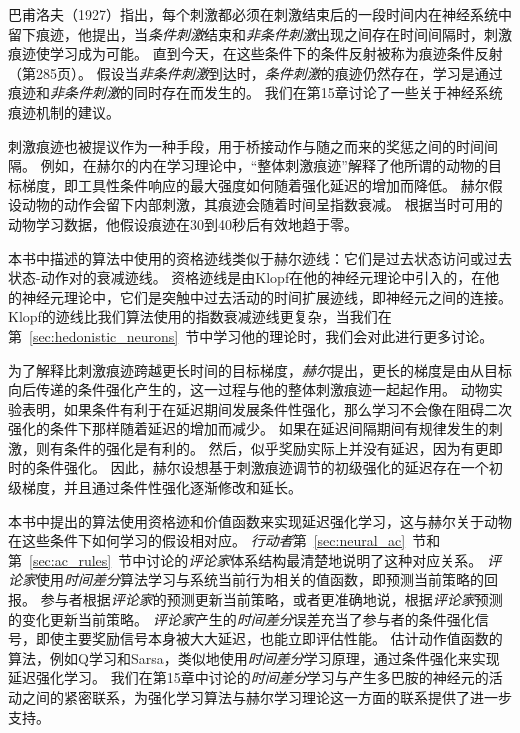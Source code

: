 巴甫洛夫（1927）指出，每个刺激都必须在刺激结束后的一段时间内在神经系统中留下痕迹，他提出，当\textit{条件刺激}结束和\textit{非条件刺激}出现之间存在时间间隔时，刺激痕迹使学习成为可能。
直到今天，在这些条件下的条件反射被称为痕迹条件反射（第285页）。
假设当\textit{非条件刺激}到达时，\textit{条件刺激}的痕迹仍然存在，学习是通过痕迹和\textit{非条件刺激}的同时存在而发生的。
我们在第15章讨论了一些关于神经系统痕迹机制的建议。


刺激痕迹也被提议作为一种手段，用于桥接动作与随之而来的奖惩之间的时间间隔。
例如，在赫尔的内在学习理论中，“整体刺激痕迹”解释了他所谓的动物的目标梯度，即工具性条件响应的最大强度如何随着强化延迟的增加而降低\cite{hull1932goal,hull1943principles}。
赫尔假设动物的动作会留下内部刺激，其痕迹会随着时间呈指数衰减。
根据当时可用的动物学习数据，他假设痕迹在30到40秒后有效地趋于零。




本书中描述的算法中使用的资格迹线类似于赫尔迹线：它们是过去状态访问或过去状态-动作对的衰减迹线。
资格迹线是由Klopf\cite{klopf1972brain}在他的神经元理论中引入的，在他的神经元理论中，它们是突触中过去活动的时间扩展迹线，即神经元之间的连接。
Klopf的迹线比我们算法使用的指数衰减迹线更复杂，当我们在第~\ref{sec:hedonistic_neurons}~节中学习他的理论时，我们会对此进行更多讨论。


为了解释比刺激痕迹跨越更长时间的目标梯度，\textit{赫尔}\cite{hull1943principles}提出，更长的梯度是由从目标向后传递的条件强化产生的，这一过程与他的整体刺激痕迹一起起作用。
动物实验表明，如果条件有利于在延迟期间发展条件性强化，那么学习不会像在阻碍二次强化的条件下那样随着延迟的增加而减少。
如果在延迟间隔期间有规律发生的刺激，则有条件的强化是有利的。
然后，似乎奖励实际上并没有延迟，因为有更即时的条件强化。
因此，赫尔设想基于刺激痕迹调节的初级强化的延迟存在一个初级梯度，并且通过条件性强化逐渐修改和延长。


本书中提出的算法使用资格迹和价值函数来实现延迟强化学习，这与赫尔关于动物在这些条件下如何学习的假设相对应。
\textit{行动者}第~\ref{sec:neural_ac}~节和第~\ref{sec:ac_rules}~节中讨论的\textit{评论家}体系结构最清楚地说明了这种对应关系。
\textit{评论家}使用\textit{时间差分}算法学习与系统当前行为相关的值函数，即预测当前策略的回报。
参与者根据\textit{评论家}的预测更新当前策略，或者更准确地说，根据\textit{评论家}预测的变化更新当前策略。
\textit{评论家}产生的\textit{时间差分}误差充当了参与者的条件强化信号，即使主要奖励信号本身被大大延迟，也能立即评估性能。
估计动作值函数的算法，例如Q学习和Sarsa，类似地使用\textit{时间差分}学习原理，通过条件强化来实现延迟强化学习。
我们在第15章中讨论的\textit{时间差分}学习与产生多巴胺的神经元的活动之间的紧密联系，为强化学习算法与赫尔学习理论这一方面的联系提供了进一步支持。


